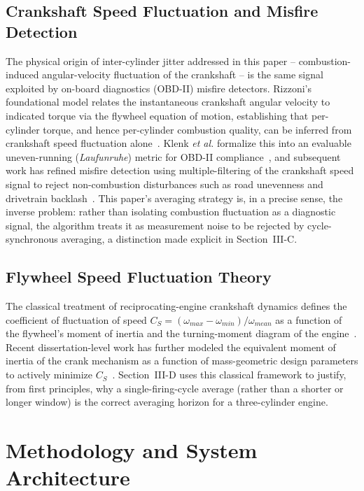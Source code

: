 \documentclass[journal, twocolumn]{IEEEtran}
\begin{document}
\subsection{Crankshaft Speed Fluctuation and Misfire Detection}
The physical origin of inter-cylinder jitter addressed in this paper -- combustion-induced angular-velocity fluctuation of the crankshaft -- is the same signal exploited by on-board diagnostics (OBD-II) misfire detectors. Rizzoni's foundational model relates the instantaneous crankshaft angular velocity to indicated torque via the flywheel equation of motion, establishing that per-cylinder torque, and hence per-cylinder combustion quality, can be inferred from crankshaft speed fluctuation alone~\cite{rizzoni1989}. Klenk \emph{et al.} formalize this into an evaluable uneven-running (\emph{Laufunruhe}) metric for OBD-II compliance~\cite{klenk1993}, and subsequent work has refined misfire detection using multiple-filtering of the crankshaft speed signal to reject non-combustion disturbances such as road unevenness and drivetrain backlash~\cite{misfire2011}. This paper's averaging strategy is, in a precise sense, the inverse problem: rather than isolating combustion fluctuation as a diagnostic signal, the algorithm treats it as measurement noise to be rejected by cycle-synchronous averaging, a distinction made explicit in Section~III-C.

\subsection{Flywheel Speed Fluctuation Theory}
The classical treatment of reciprocating-engine crankshaft dynamics defines the coefficient of fluctuation of speed $C_S = (\omega_{max}-\omega_{min})/\omega_{mean}$ as a function of the flywheel's moment of inertia and the turning-moment diagram of the engine~\cite{khurmi_tom}. Recent dissertation-level work has further modeled the equivalent moment of inertia of the crank mechanism as a function of mass-geometric design parameters to actively minimize $C_S$~\cite{lomakin2018}. Section~III-D uses this classical framework to justify, from first principles, why a single-firing-cycle average (rather than a shorter or longer window) is the correct averaging horizon for a three-cylinder engine.

\section{Methodology and System Architecture}
\end{document}
